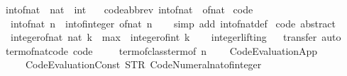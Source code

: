 \begin{isabellebody}
\ int{\isacharunderscore}of{\isacharunderscore}nat\ {\isacharcolon}{\isacharcolon}\ {\isachardoublequoteopen}nat\ {\isasymRightarrow}\ int{\isachardoublequoteclose}\ \isanewline
\ \ {\isacharbrackleft}code{\isacharunderscore}abbrev{\isacharbrackright}{\isacharcolon}\ {\isachardoublequoteopen}int{\isacharunderscore}of{\isacharunderscore}nat\ {\isacharequal}\ of{\isacharunderscore}nat{\isachardoublequoteclose}\isanewline
\isanewline
{}\isamarkupfalse%
\ {\isacharbrackleft}code{\isacharbrackright}{\isacharcolon}\isanewline
\ \ {\isachardoublequoteopen}int{\isacharunderscore}of{\isacharunderscore}nat\ n\ {\isacharequal}\ int{\isacharunderscore}of{\isacharunderscore}integer\ {\isacharparenleft}of{\isacharunderscore}nat\ n{\isacharparenright}{\isachardoublequoteclose}\isanewline
%
\isadelimproof
\ \ %
\endisadelimproof
%
\isatagproof
{}\isamarkupfalse%
\ {\isacharparenleft}simp\ add{\isacharcolon}\ int{\isacharunderscore}of{\isacharunderscore}nat{\isacharunderscore}def{\isacharparenright}%
\endisatagproof
{\isafoldproof}%
%
\isadelimproof
\isanewline
%
\endisadelimproof
\isanewline
{}\isamarkupfalse%
\ {\isacharbrackleft}code\ abstract{\isacharbrackright}{\isacharcolon}\isanewline
\ \ {\isachardoublequoteopen}integer{\isacharunderscore}of{\isacharunderscore}nat\ {\isacharparenleft}nat\ k{\isacharparenright}\ {\isacharequal}\ max\ {}\ {\isacharparenleft}integer{\isacharunderscore}of{\isacharunderscore}int\ k{\isacharparenright}{\isachardoublequoteclose}\isanewline
\ \ \isamarkupfalse%
\ integer{\isachardot}lifting%
\isadelimproof
\ %
\endisadelimproof
%
\isatagproof
{}\isamarkupfalse%
\ transfer\ auto%
\endisatagproof
{\isafoldproof}%
%
\isadelimproof
%
\endisadelimproof
\isanewline
\isanewline
{}\isamarkupfalse%
\ term{\isacharunderscore}of{\isacharunderscore}nat{\isacharunderscore}code\ {\isacharbrackleft}code{\isacharbrackright}{\isacharcolon}\isanewline
\ \ %
\isanewline
\ \ {\isachardoublequoteopen}term{\isacharunderscore}of{\isacharunderscore}class{\isachardot}term{\isacharunderscore}of\ n\ {\isacharequal}\isanewline
\ \ \ Code{\isacharunderscore}Evaluation{\isachardot}App\isanewline
\ \ \ \ \ {\isacharparenleft}Code{\isacharunderscore}Evaluation{\isachardot}Const\ {\isacharparenleft}STR\ {\isacharprime}{\isacharprime}Code{\isacharunderscore}Numeral{\isachardot}nat{\isacharunderscore}of{\isacharunderscore}integer{\isacharprime}{\isacharprime}{\isacharparenright}\isanewline

\end{isabellebody}

